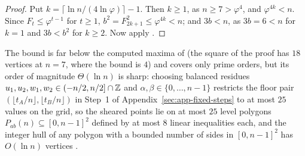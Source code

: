 \begin{proof}
Put $k=\lceil\ln n/(4\ln\varphi)\rceil-1$. Then $k\ge1$, as $n\ge7>\varphi^4$, and $\varphi^{4k}<n$.
Since $F_t\le\varphi^{t-1}$ for $t\ge1$, $b^2=F_{2k+1}^2\le\varphi^{4k}<n$; and $3b<n$, as $3b=6<n$ for $k=1$ and $3b<b^2$ for $k\ge2$.
Now apply .
\end{proof}

The bound is far below the computed maxima of  (the square of the proof has $18$ vertices at $n=7$, where the bound is $4$) and covers only prime orders, but its order of magnitude $\Theta(\ln n)$ is sharp: choosing balanced residues $u_1,u_2,w_1,w_2\in(-n/2,n/2]\cap\mathbb{Z}$ and $\alpha,\beta\in\{0,\dots,n-1\}$ restricts the floor pair $(\lfloor t_A/n\rfloor,\lfloor t_B/n\rfloor)$ in Step~1 of Appendix~\ref{sec:app-fixed-steps} to at most $25$ values on the grid, so the sheared points lie on at most $25$ level polygons $P_{ab}(n)\subseteq[0,n-1]^2$ defined by at most $8$ linear inequalities each, and the integer hull of any polygon with a bounded number of sides in $[0,n-1]^2$ has $O(\ln n)$ vertices \cite[Sect.~2]{zolotykh2006vertices}.
